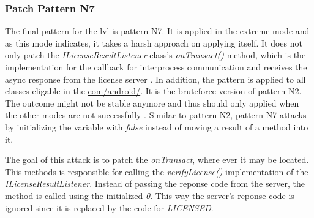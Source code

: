 \subsubsection{Patch Pattern N7}
The final pattern for the \gls{lvl} is pattern N7.
It is applied in the extreme mode and as this mode indicates, it takes a harsh approach on applying itself.
It does not only patch the \textit{ILicenseResultListener} class's \textit{onTransact()} method, which is the implementation for the callback for interprocess communication and receives the async response from the license server \cite{developersLicensingReference}.
In addition, the pattern is applied to all classes eligable in the \url{com/android/}.
It is the bruteforce version of pattern N2.
The outcome might not be stable anymore and thus should only applied when the other modes are not successfully .
\newline
Similar to pattern N2, pattern N7 attacks by initializing the variable with \textit{false} instead of moving a result of a method into it.
\newline

The goal of this attack is to patch the \textit{onTransact}, where ever it may be located.
This methods is responsible for calling the \textit{verifyLicense()} implementation of the \textit{ILicenseResultListener}.
Instead of passing the reponse code from the server, the method is called using the initialized \textit{0}.
This way the server's reponse code is ignored since it is replaced by the code for \textit{LICENSED}.

